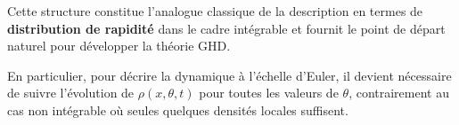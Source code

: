 Cette structure constitue l’analogue classique de la description en termes de {\bf distribution de rapidité} dans le cadre intégrable et fournit le point de départ naturel pour développer la théorie \gls{GHD}. 

\medskip
 
En particulier, pour décrire la dynamique à l’échelle d’Euler, il devient nécessaire de suivre l’évolution de \(\rho(x,\theta,t)\) pour toutes les valeurs de \(\theta\), contrairement au cas non intégrable où seules quelques densités locales suffisent.



{\color{blue}



}







